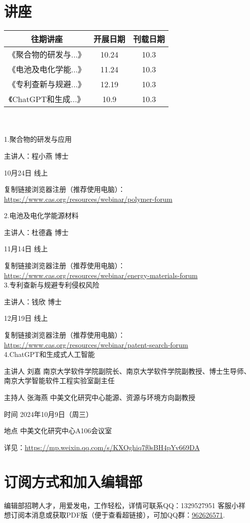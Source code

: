\documentclass[letterpaper, 12pt]{article}
\begin{document}
\begin{multicols}{2}
\begin{tabular}{|c|c|c|}
    \hline
    \end{tabular}
\section{讲座}
\begin{tabular}{|c|c|c|}
    \hline
    往期讲座 & 开展日期 & 刊载日期\\
    \hline\hline
    《聚合物的研发与...》 & 10.24 & 10.3\\
    《电池及电化学能...》 & 11.24 & 10.3\\
    《专利查新与规避...》 & 12.19 & 10.3\\
    《ChatGPT和生成...》 & 10.9 & 10.3\\
      \hline
\end{tabular}\\\\
1.聚合物的研发与应用

主讲人：程小燕 博士

10月24日 线上

复制链接浏览器注册（推荐使用电脑）：\url{https://www.cas.org/resources/webinar/polymer-forum}

2.电池及电化学能源材料

主讲人：杜德鑫 博士

11月14日 线上

复制链接浏览器注册（推荐使用电脑）：\url{https://www.cas.org/resources/webinar/energy-materials-forum}\\
3.专利查新与规避专利侵权风险

主讲人：钱欣 博士

12月19日 线上

复制链接浏览器注册（推荐使用电脑）：\url{https://www.cas.org/resources/webinar/patent-search-forum}\\
4.ChatGPT和生成式人工智能

主讲人 刘嘉 南京大学软件学院副院长、南京大学软件学院副教授、博士生导师、南京大学智能软件工程实验室副主任

主持人 张海燕 中美文化研究中心能源、资源与环境方向副教授

时间 2024年10月9日（周三）

地点 中美文化研究中心A106会议室

详见：\url{https://mp.weixin.qq.com/s/KXOghiq7f0sBH4pYv669DA}

\section{订阅方式和加入编辑部}
编辑部招聘人才，用爱发电，工作轻松，详情可联系QQ：1329527951 客服小祥\\想订阅本消息或获取PDF版（便于查看超链接），可加QQ群：\href{https://qm.qq.com/q/FGX1VYCrGS}{962626571}.

\end{multicols}
\end{document}

